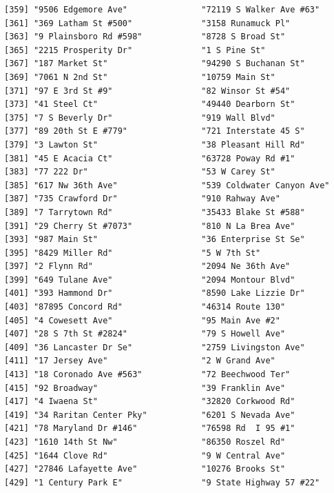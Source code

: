 \documentclass[
  12pt,
]{article}
\begin{document}
\begin{verbatim}
[359] "9506 Edgemore Ave"               "72119 S Walker Ave #63"         
[361] "369 Latham St #500"              "3158 Runamuck Pl"               
[363] "9 Plainsboro Rd #598"            "8728 S Broad St"                
[365] "2215 Prosperity Dr"              "1 S Pine St"                    
[367] "187 Market St"                   "94290 S Buchanan St"            
[369] "7061 N 2nd St"                   "10759 Main St"                  
[371] "97 E 3rd St #9"                  "82 Winsor St #54"               
[373] "41 Steel Ct"                     "49440 Dearborn St"              
[375] "7 S Beverly Dr"                  "919 Wall Blvd"                  
[377] "89 20th St E #779"               "721 Interstate 45 S"            
[379] "3 Lawton St"                     "38 Pleasant Hill Rd"            
[381] "45 E Acacia Ct"                  "63728 Poway Rd #1"              
[383] "77 222 Dr"                       "53 W Carey St"                  
[385] "617 Nw 36th Ave"                 "539 Coldwater Canyon Ave"       
[387] "735 Crawford Dr"                 "910 Rahway Ave"                 
[389] "7 Tarrytown Rd"                  "35433 Blake St #588"            
[391] "29 Cherry St #7073"              "810 N La Brea Ave"              
[393] "987 Main St"                     "36 Enterprise St Se"            
[395] "8429 Miller Rd"                  "5 W 7th St"                     
[397] "2 Flynn Rd"                      "2094 Ne 36th Ave"               
[399] "649 Tulane Ave"                  "2094 Montour Blvd"              
[401] "393 Hammond Dr"                  "8590 Lake Lizzie Dr"            
[403] "87895 Concord Rd"                "46314 Route 130"                
[405] "4 Cowesett Ave"                  "95 Main Ave #2"                 
[407] "28 S 7th St #2824"               "79 S Howell Ave"                
[409] "36 Lancaster Dr Se"              "2759 Livingston Ave"            
[411] "17 Jersey Ave"                   "2 W Grand Ave"                  
[413] "18 Coronado Ave #563"            "72 Beechwood Ter"               
[415] "92 Broadway"                     "39 Franklin Ave"                
[417] "4 Iwaena St"                     "32820 Corkwood Rd"              
[419] "34 Raritan Center Pky"           "6201 S Nevada Ave"              
[421] "78 Maryland Dr #146"             "76598 Rd  I 95 #1"              
[423] "1610 14th St Nw"                 "86350 Roszel Rd"                
[425] "1644 Clove Rd"                   "9 W Central Ave"                
[427] "27846 Lafayette Ave"             "10276 Brooks St"                
[429] "1 Century Park E"                "9 State Highway 57 #22"         

\end{verbatim}
\end{document}
